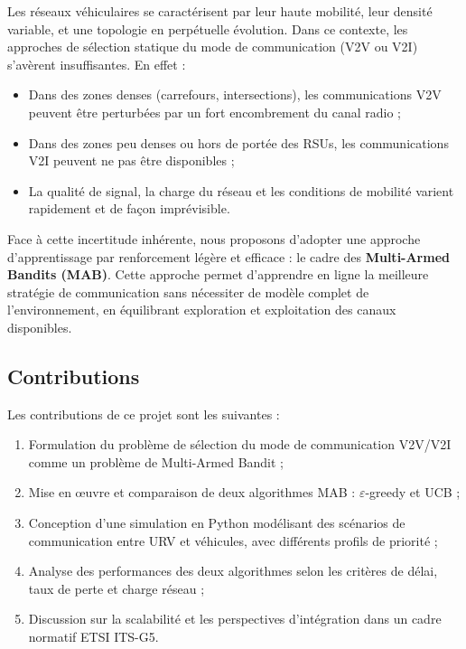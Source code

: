 \documentclass[12pt,a4paper]{article}
\begin{document}
Les réseaux véhiculaires se caractérisent par leur haute mobilité, leur densité
variable, et une topologie en perpétuelle évolution. Dans ce contexte, les approches
de sélection statique du mode de communication (V2V ou V2I) s'avèrent insuffisantes.
En effet :
\begin{itemize}[leftmargin=*]
  \item Dans des zones denses (carrefours, intersections), les communications V2V
        peuvent être perturbées par un fort encombrement du canal radio ;
  \item Dans des zones peu denses ou hors de portée des RSUs, les communications V2I
        peuvent ne pas être disponibles ;
  \item La qualité de signal, la charge du réseau et les conditions de mobilité
        varient rapidement et de façon imprévisible.
\end{itemize}

Face à cette incertitude inhérente, nous proposons d'adopter une approche
d'apprentissage par renforcement légère et efficace : le cadre des
\textbf{Multi-Armed Bandits (MAB)}. Cette approche permet d'apprendre en ligne
la meilleure stratégie de communication sans nécessiter de modèle complet de
l'environnement, en équilibrant exploration et exploitation des canaux disponibles.

\subsection{Contributions}

Les contributions de ce projet sont les suivantes :
\begin{enumerate}[leftmargin=*]
  \item Formulation du problème de sélection du mode de communication V2V/V2I
        comme un problème de Multi-Armed Bandit ;
  \item Mise en œuvre et comparaison de deux algorithmes MAB :
        $\varepsilon$-greedy et UCB ;
  \item Conception d'une simulation en Python modélisant des scénarios de
        communication entre URV et véhicules, avec différents profils de priorité ;
  \item Analyse des performances des deux algorithmes selon les critères de
        délai, taux de perte et charge réseau ;
  \item Discussion sur la scalabilité et les perspectives d'intégration dans
        un cadre normatif ETSI ITS-G5.
\end{enumerate}
\end{document}
